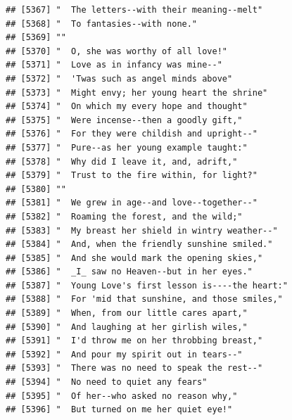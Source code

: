 \documentclass{article}\usepackage[]{graphicx}\usepackage[]{color}
\makeatletter
\newenvironment{kframe}{%
 \def\at@end@of@kframe{}%
 \ifinner\ifhmode%
  \def\at@end@of@kframe{\end{minipage}}%
  \begin{minipage}{\columnwidth}%
 \fi\fi%
 \def\FrameCommand##1{\hskip\@totalleftmargin \hskip-\fboxsep
 \colorbox{shadecolor}{##1}\hskip-\fboxsep
     \hskip-\linewidth \hskip-\@totalleftmargin \hskip\columnwidth}%
 \MakeFramed {\advance\hsize-\width
   \@totalleftmargin\z@ \linewidth\hsize
   \@setminipage}}%
 {\par\unskip\endMakeFramed%
 \at@end@of@kframe}
\newenvironment{knitrout}{}{} %
\makeatother
\begin{document}
\begin{knitrout}
\begin{kframe}
\begin{verbatim}
## [5367] "  The letters--with their meaning--melt"                                     
## [5368] "  To fantasies--with none."                                                  
## [5369] ""                                                                            
## [5370] "  O, she was worthy of all love!"                                            
## [5371] "  Love as in infancy was mine--"                                             
## [5372] "  'Twas such as angel minds above"                                           
## [5373] "  Might envy; her young heart the shrine"                                    
## [5374] "  On which my every hope and thought"                                        
## [5375] "  Were incense--then a goodly gift,"                                         
## [5376] "  For they were childish and upright--"                                      
## [5377] "  Pure--as her young example taught:"                                        
## [5378] "  Why did I leave it, and, adrift,"                                          
## [5379] "  Trust to the fire within, for light?"                                      
## [5380] ""                                                                            
## [5381] "  We grew in age--and love--together--"                                      
## [5382] "  Roaming the forest, and the wild;"                                         
## [5383] "  My breast her shield in wintry weather--"                                  
## [5384] "  And, when the friendly sunshine smiled."                                   
## [5385] "  And she would mark the opening skies,"                                     
## [5386] "  _I_ saw no Heaven--but in her eyes."                                       
## [5387] "  Young Love's first lesson is----the heart:"                                
## [5388] "  For 'mid that sunshine, and those smiles,"                                 
## [5389] "  When, from our little cares apart,"                                        
## [5390] "  And laughing at her girlish wiles,"                                        
## [5391] "  I'd throw me on her throbbing breast,"                                     
## [5392] "  And pour my spirit out in tears--"                                         
## [5393] "  There was no need to speak the rest--"                                     
## [5394] "  No need to quiet any fears"                                                
## [5395] "  Of her--who asked no reason why,"                                          
## [5396] "  But turned on me her quiet eye!"                                           

\end{verbatim}
\end{kframe}
\end{knitrout}
\end{document}
